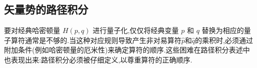 \subsection{矢量势的路径积分}
要对经典哈密顿量 $H(p,q)$ 进行量子化,仅仅将经典变量 $ p $ 和 $ q $ 替换为相应的量子算符通常是不够的.当这种对应规则导致产生非对易算符$\hat p$​ 和$\hat q$​ 的乘积时,必须通过附加条件(例如哈密顿量的厄米性)来确定算符的顺序.这些困难在路径积分表述中也表现出来:路径积分必须被仔细定义,以尊重算符的正确顺序.































































































	
\ifx\allfiles\undefined

	\else
	\fi
